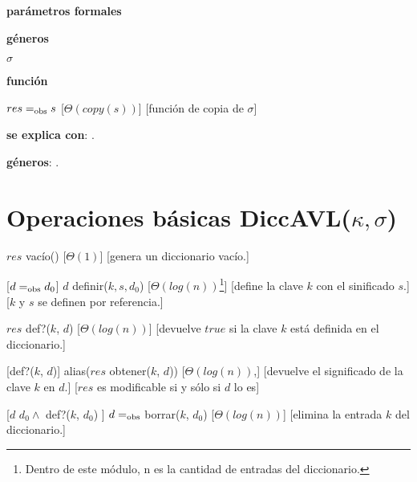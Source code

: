 \begin{Interfaz}
  \textbf{parámetros formales}\parindent\\
  \parbox{1.7cm}{\textbf{géneros}} $\sigma$\\
  \parbox[t]{1.7cm}{\textbf{función}}\parbox[t]{\textwidth-2\parindent-1.7cm}{    	
    {$res =_{\mathrm{obs}} s$}
    [$\Theta(copy(s))$]
    [función de copia de $\sigma$]
    }
      
  \textbf{se explica con}: .

  \textbf{géneros}: .

  \section*{Operaciones básicas DiccAVL($\kappa, \sigma$)}

  {$res$ \igobs vacío()}
  [$\Theta(1)$]
  [genera un diccionario vacío.]

  [$d =_{\mathrm{obs}} d_0$]  
  {$d$ \igobs definir($k, s, d_0$)}
  [$\Theta(log(n))$\footnote{Dentro de este módulo, n es la cantidad de entradas del diccionario.}]
  [define la clave $k$ con el sinificado $s$.]
  [$k$ y $s$ se definen por referencia.]
    
  {$res$ \igobs def?($k$, $d$) }
  [$\Theta(log(n))$]
  [devuelve $true$ si la clave $k$ está definida en el diccionario.]
  
  [def?($k$, $d$)]  
  {alias($res$ \igobs obtener($k$, $d$))}
  [$\Theta(log(n))$,]
  [devuelve el significado de la clave $k$ en $d$.]
  [$res$ es modificable si y sólo si $d$ lo es]
  
  [$d$ \igobs $d_0 \land$ def?($k$, $d_0$) ]
  {$d =_{\mathrm{obs}}$ borrar($k$, $d_0$)}
  [$\Theta(log(n))$]
  [elimina la entrada $k$ del diccionario.] 
  
\end{Interfaz}

